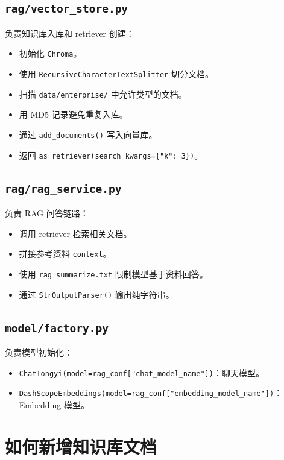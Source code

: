 \documentclass[UTF8,zihao=-4]{ctexart}
\begin{document}
\subsection{\texttt{rag/vector\_store.py}}

负责知识库入库和 retriever 创建：

\begin{itemize}
\item 初始化 \texttt{Chroma}。
\item 使用 \texttt{RecursiveCharacterTextSplitter} 切分文档。
\item 扫描 \texttt{data/enterprise/} 中允许类型的文档。
\item 用 MD5 记录避免重复入库。
\item 通过 \texttt{add\_documents()} 写入向量库。
\item 返回 \texttt{as\_retriever(search\_kwargs=\{"k": 3\})}。
\end{itemize}

\subsection{\texttt{rag/rag\_service.py}}

负责 RAG 问答链路：

\begin{itemize}
\item 调用 retriever 检索相关文档。
\item 拼接参考资料 \texttt{context}。
\item 使用 \texttt{rag\_summarize.txt} 限制模型基于资料回答。
\item 通过 \texttt{StrOutputParser()} 输出纯字符串。
\end{itemize}

\subsection{\texttt{model/factory.py}}

负责模型初始化：

\begin{itemize}
\item \texttt{ChatTongyi(model=rag\_conf["chat\_model\_name"])}：聊天模型。
\item \texttt{DashScopeEmbeddings(model=rag\_conf["embedding\_model\_name"])}：Embedding 模型。
\end{itemize}

\section{如何新增知识库文档}
\end{document}

